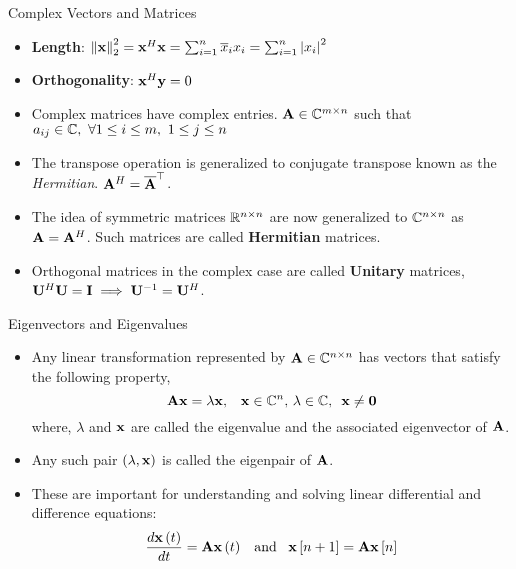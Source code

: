 \documentclass[aspectratio=169]{beamer}
\let\olditem\item
\renewcommand{\item}{\setlength{\itemsep}{\fill}\olditem}
\def\mf{\ensuremath\mathbf}
\def\mb{\ensuremath\mathbb}
\begin{document}
\begin{frame}[t]{Complex Vectors and Matrices}
\begin{itemize}
    \item \textbf{Length}: $\left\lVert \mf{x}\right\rVert_2^2 = \mf{x}^H\mf{x} = \sum_{i=1}^n\overline{x}_ix_i = \sum_{i=1}^n\left\lvert x_i\right\rvert^2$

    \item \textbf{Orthogonality}: $\mf{x}^H\mf{y} = 0$

    \item Complex matrices have complex entries. $\mf{A} \in \mb{C}^{m \times n}$ such that $a_{ij} \in \mb{C}, \,\, \forall 1 \leq i \leq m, \,\, 1 \leq j \leq n$

    \item The transpose operation is generalized to conjugate transpose known as the \textit{Hermitian}. $\mf{A}^H = \overline{\mf{A}}^\top$.
    
    \item The idea of symmetric matrices $\mb{R}^{n \times n}$ are now generalized to $\mb{C}^{n \times n}$  as $\mf{A} = \mf{A}^H$. Such matrices are called \textbf{Hermitian} matrices.

    \item Orthogonal matrices in the complex case are called \textbf{Unitary} matrices, $\mf{U}^H\mf{U} = \mf{I} \implies \mf{U}^{-1} = \mf{U}^H$.
\end{itemize}
\end{frame}


\begin{frame}[t]{Eigenvectors and Eigenvalues}
\begin{itemize}
    \item Any linear transformation represented by $\mf{A} \in \mb{C}^{n \times n}$ has vectors that satisfy the following property,
    \[ \mf{Ax} = \lambda \mf{x}, \,\,\,\,\, \mf{x} \in \mb{C}^n, \, \lambda \in \mb{C}, \,\,\, \mf{x} \neq \mf{0} \]
    where, $\lambda$ and $\mf{x}$ are called the eigenvalue and the associated eigenvector of $\mf{A}$.
    
    \item Any such pair $\left(\lambda, \mf{x}\right)$ is called the eigenpair of $\mf{A}$.
    
    \item These are important for understanding and solving linear differential and difference equations:
    \[ \frac{d\mf{x}\left(t\right)}{dt} = \mf{A}\mf{x}\left(t\right) \,\,\, \text{ and } \,\,\, \mf{x}\left[n+1\right] = \mf{A}\mf{x}\left[n\right] \]
\end{itemize}
\end{frame}
\end{document}
